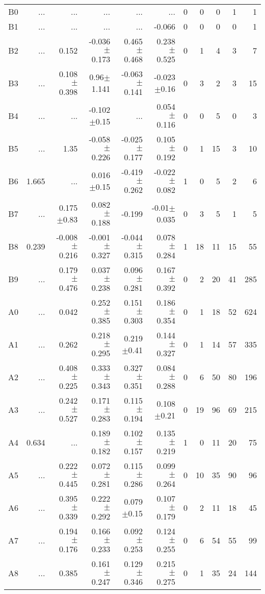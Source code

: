\begin{table}[t]
\begin{table}[t]
\begin{center}
\begin{tabular}{c|rrrrr|rrrrr}
    B0	&	 ...	&	 ...	&	 ...	&	 ...	&	 ...	&	0	&	0	&	0	&	1	&	1	\\
    B1	&	 ...	&	 ...	&	 ...	&	 ...	&	-0.066	&	0	&	0	&	0	&	0	&	1	\\
    B2	&	 ...	&	0.152	&	-0.036$\pm$0.173	&	0.465$\pm$0.468	&	0.238$\pm$0.525	&	0	&	1	&	4	&	3	&	7	\\
    B3	&	 ...	&	0.108$\pm$0.398	&	0.96$\pm$1.141	&	-0.063$\pm$0.141	&	-0.023$\pm$0.16	&	0	&	3	&	2	&	3	&	15	\\
    B4	&	 ...	&	 ...	&	-0.102$\pm$0.15	&	 ...	&	0.054$\pm$0.116	&	0	&	0	&	5	&	0	&	3	\\
    B5	&	 ...	&	1.35	&	-0.058$\pm$0.226	&	-0.025$\pm$0.177	&	0.105$\pm$0.192	&	0	&	1	&	15	&	3	&	10	\\
    B6	&	1.665	&	 ...	&	0.016$\pm$0.15	&	-0.419$\pm$0.262	&	-0.022$\pm$0.082	&	1	&	0	&	5	&	2	&	6	\\
    B7	&	 ...	&	0.175$\pm$0.83	&	0.082$\pm$0.188	&	-0.199	&	-0.01$\pm$0.035	&	0	&	3	&	5	&	1	&	5	\\
    B8	&	0.239	&	-0.008$\pm$0.216	&	-0.001$\pm$0.327	&	-0.044$\pm$0.315	&	0.078$\pm$0.284	&	1	&	18	&	11	&	15	&	55	\\
    B9	&	 ...	&	0.179$\pm$0.476	&	0.037$\pm$0.238	&	0.096$\pm$0.281	&	0.167$\pm$0.392	&	0	&	2	&	20	&	41	&	285	\\
    A0	&	 ...	&	0.042	&	0.252$\pm$0.385	&	0.151$\pm$0.303	&	0.186$\pm$0.354	&	0	&	1	&	18	&	52	&	624	\\
    A1	&	 ...	&	0.262	&	0.218$\pm$0.295	&	0.219$\pm$0.41	&	0.144$\pm$0.327	&	0	&	1	&	14	&	57	&	335	\\
    A2	&	 ...	&	0.408$\pm$0.225	&	0.333$\pm$0.343	&	0.327$\pm$0.351	&	0.084$\pm$0.288	&	0	&	6	&	50	&	80	&	196	\\
    A3	&	 ...	&	0.242$\pm$0.527	&	0.171$\pm$0.283	&	0.115$\pm$0.194	&	0.108$\pm$0.21	&	0	&	19	&	96	&	69	&	215	\\
    A4	&	0.634	&	 ...	&	0.189$\pm$0.182	&	0.102$\pm$0.157	&	0.135$\pm$0.219	&	1	&	0	&	11	&	20	&	75	\\
    A5	&	 ...	&	0.222$\pm$0.445	&	0.072$\pm$0.281	&	0.115$\pm$0.286	&	0.099$\pm$0.264	&	0	&	10	&	35	&	90	&	96	\\
    A6	&	 ...	&	0.395$\pm$0.339	&	0.222$\pm$0.292	&	0.079$\pm$0.15	&	0.107$\pm$0.179	&	0	&	2	&	11	&	18	&	45	\\
    A7	&	 ...	&	0.194$\pm$0.176	&	0.166$\pm$0.233	&	0.092$\pm$0.253	&	0.124$\pm$0.255	&	0	&	6	&	54	&	55	&	99	\\
    A8	&	 ...	&	0.385	&	0.161$\pm$0.247	&	0.129$\pm$0.346	&	0.215$\pm$0.275	&	0	&	1	&	35	&	24	&	144	\\

\end{tabular}
\end{center}
\end{table}
\end{table}
